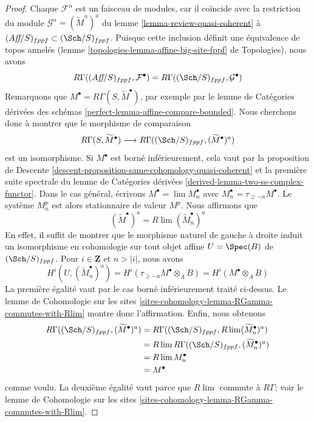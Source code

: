\begin{proof}
Chaque $\mathcal{F}^n$ est un faisceau de modules, car il coïncide avec la
restriction du module $\mathcal{G}^n = (\widetilde{M}^n)^a$ du
lemme \ref{lemma-review-quasi-coherent} à
$(\textit{Aff}/S)_{fppf} \subset (\Sch/S)_{fppf}$.
Puisque cette inclusion définit une équivalence de topos annelés
(lemme \ref{topologies-lemma-affine-big-site-fppf} de Topologies),
nous avons
$$
R\Gamma((\textit{Aff}/S)_{fppf}, \mathcal{F}^\bullet) =
R\Gamma((\Sch/S)_{fppf}, \mathcal{G}^\bullet)
$$
Remarquons que $M^\bullet = R\Gamma(S, \widetilde{M}^\bullet)$,
par exemple par le lemme de Catégories dérivées des schémas
\ref{perfect-lemma-affine-compare-bounded}. Nous cherchons donc
à montrer que le morphisme de comparaison
$$
R\Gamma(S, \widetilde{M}^\bullet)
\longrightarrow
R\Gamma((\Sch/S)_{fppf}, (\widetilde{M}^\bullet)^a)
$$
est un isomorphisme. Si $M^\bullet$ est borné inférieurement, cela
vaut par la proposition de Descente
\ref{descent-proposition-same-cohomology-quasi-coherent}
et la première suite spectrale du lemme de Catégories dérivées
\ref{derived-lemma-two-ss-complex-functor}.
Dans le cas général, écrivons $M^\bullet = \lim M_n^\bullet$
avec $M_n^\bullet = \tau_{\geq -n}M^\bullet$. Le système
$M_n^p$ est alors stationnaire de valeur $M^p$. Nous affirmons que
$$
(\widetilde{M}^\bullet)^a = R\lim (\widetilde{M}_n^\bullet)^a
$$
En effet, il suffit de montrer que le morphisme naturel de gauche à droite
induit un isomorphisme en cohomologie sur tout objet affine
$U = \Spec(B)$ de $(\Sch/S)_{fppf}$. Pour $i \in \mathbf{Z}$ et
$n > |i|$, nous avons
$$
H^i(U, (\widetilde{M}_n^\bullet)^a) =
H^i(\tau_{\geq -n}M^\bullet \otimes_A B) =
H^i(M^\bullet \otimes_A B)
$$
La première égalité vaut par le cas borné inférieurement traité ci-dessus.
Le lemme de Cohomologie sur les sites
\ref{sites-cohomology-lemma-RGamma-commutes-with-Rlim}
montre donc l'affirmation. Enfin, nous obtenons
\begin{align*}
R\Gamma((\Sch/S)_{fppf}, (\widetilde{M}^\bullet)^a)
& =
R\Gamma((\Sch/S)_{fppf}, R\lim (\widetilde{M}_n^\bullet)^a) \\
& =
R\lim R\Gamma((\Sch/S)_{fppf}, (\widetilde{M}_n^\bullet)^a) \\
& =
R\lim M_n^\bullet \\
& =
M^\bullet
\end{align*}
comme voulu. La deuxième égalité vaut parce que $R\lim$ commute à
$R\Gamma$; voir le lemme de Cohomologie sur les sites
\ref{sites-cohomology-lemma-RGamma-commutes-with-Rlim}.
\end{proof}










